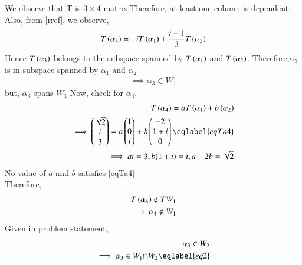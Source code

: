 \documentclass[journal,12pt,twocolumn]{IEEEtran}
\begin{document}
We observe that T\brak{\alpha} is $3\times4$ matrix.Therefore, at least one column is dependent.\newline
Also, from \eqref{rref}, we observe,
\begin{align}
   T\left(\alpha_3\right)=-i T\left(\alpha_1\right)+\frac{i-1}{2}T\left(\alpha_2\right) 
\end{align}
 Hence $T\left(\alpha_3\right)$ belongs to the subspace spanned by $T\left(\alpha_1\right)$ and $T\left(\alpha_2\right)$.\newline
 Therefore,$\alpha_3$ is in subspace spanned by ${\alpha_1}$ and ${\alpha_2}$
 \begin{align}
    \implies \alpha_3 \in W_1
\end{align}
 but, $\alpha_3$ spans $W_1$\newline
Now, check for $\alpha_4$,
\begin{align}
    T\brak{\alpha_4}=a T\brak{\alpha_1}+b\brak{\alpha_2}\\
    \implies \myvec{\sqrt{2}\\i\\3}=a\myvec{1\\0\\i}+b\myvec{-2\\1+i\\0} \eqlabel{eqTa4}\\
    \implies ai=3, b(1+i)=i, a-2b=\sqrt{2}
\end{align}
No value of $a$ and $b$ satisfies \eqref{eqTa4}\\
Therefore, 
\begin{align}
    T\left(\alpha_4\right) \notin TW_1\\
    \implies \alpha_4 \notin W_1
\end{align}
Given in problem statement,
    \begin{align}
    \alpha_3 \in W_2\\
     \implies \alpha_3 \in W_1 {\displaystyle \cap } W_2\eqlabel{eq2}
 \end{align}
\end{document}
